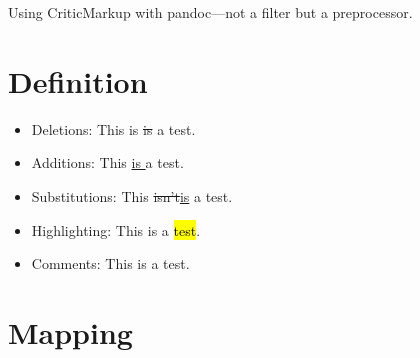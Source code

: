\documentclass[]{article}
\date{}
\providecommand{\tightlist}{%
  \setlength{\itemsep}{0pt}\setlength{\parskip}{0pt}}
\begin{document}
Using CriticMarkup with pandoc---not a filter but a preprocessor.

\section{Definition}\label{definition}

\begin{itemize}
\tightlist
\item
  Deletions: This is \st{is }a test.
\item
  Additions: This \underline{is }a test.
\item
  Substitutions: This \st{isn't}\underline{is} a test.
\item
  Highlighting: This is a \hl{test}.
\item
  Comments: This is a test.
\end{itemize}

\section{Mapping}\label{mapping}
\end{document}
